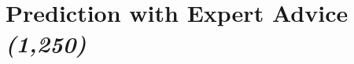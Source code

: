 \section{Prediction with Expert Advice \textit{(1,250)}}\label{section:Prediciton_with_Expert_Advice}